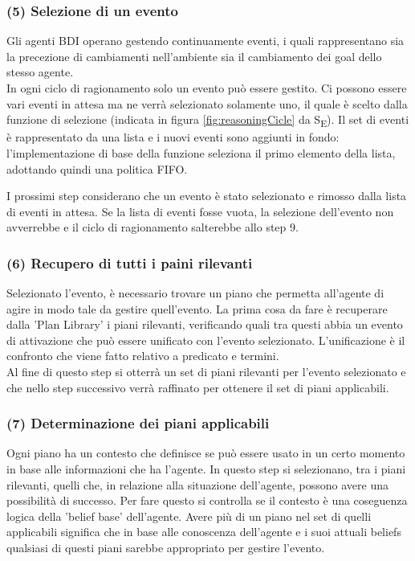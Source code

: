 \documentclass[12pt,a4paper,openright,twoside]{report}
\begin{document}
\subsubsection{(5) Selezione di un evento}
Gli agenti BDI operano gestendo continuamente eventi, i quali rappresentano sia la precezione di cambiamenti nell'ambiente sia il cambiamento dei goal dello stesso agente.
\\
In ogni ciclo di ragionamento solo un evento pu\`o essere gestito. Ci possono essere vari eventi in attesa ma ne verr\`a selezionato solamente uno, il quale \`e scelto dalla funzione di selezione (indicata in figura \ref{fig:reasoningCicle} da S\textsubscript{E}). Il set di eventi \`e rappresentato da una lista e i nuovi eventi sono aggiunti in fondo: l'implementazione di base della funzione seleziona il primo elemento della lista, adottando quindi una politica FIFO.

I prossimi step considerano che un evento \`e stato selezionato e rimosso dalla lista di eventi in attesa. Se la lista di eventi fosse vuota, la selezione dell'evento non avverrebbe e il ciclo di ragionamento salterebbe allo step 9.

\subsubsection{(6) Recupero di tutti i paini rilevanti}
Selezionato l'evento, \`e necessario trovare un piano che permetta all'agente di agire in modo tale da gestire quell'evento. La prima cosa da fare \`e recuperare dalla 'Plan Library' i piani rilevanti, verificando quali tra questi abbia un evento di attivazione che pu\`o essere unificato con l'evento selezionato. L'unificazione \`e il confronto che viene fatto relativo a predicato e termini.
\\
Al fine di questo step si otterr\`a un set di piani rilevanti per l'evento selezionato e che nello step successivo verr\`a raffinato per ottenere il set di piani applicabili.


\subsubsection{(7) Determinazione dei piani applicabili}
Ogni piano ha un contesto che definisce se pu\`o essere usato in un certo momento in base alle informazioni che ha l'agente. In questo step si selezionano, tra i piani rilevanti, quelli che, in relazione alla situazione dell'agente, possono avere una possibilit\`a di successo. Per fare questo si controlla se il contesto \`e una coseguenza logica della 'belief base' dell'agente. Avere pi\`u di un piano nel set di quelli applicabili significa che in base alle conoscenza dell'agente e i suoi attuali beliefs qualsiasi di questi piani sarebbe appropriato per gestire l'evento.
\end{document}
